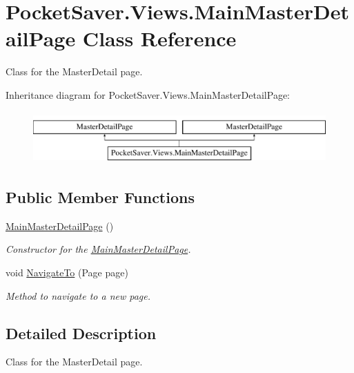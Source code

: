 \hypertarget{class_pocket_saver_1_1_views_1_1_main_master_detail_page}{}\section{Pocket\+Saver.\+Views.\+Main\+Master\+Detail\+Page Class Reference}
\label{class_pocket_saver_1_1_views_1_1_main_master_detail_page}


Class for the Master\+Detail page.  


Inheritance diagram for Pocket\+Saver.\+Views.\+Main\+Master\+Detail\+Page\+:\begin{figure}[H]
\begin{center}
\leavevmode
\includegraphics[height=2.000000cm]{class_pocket_saver_1_1_views_1_1_main_master_detail_page}
\end{center}
\end{figure}
\subsection*{Public Member Functions}
\begin{DoxyCompactItemize}
\item 
\hyperlink{class_pocket_saver_1_1_views_1_1_main_master_detail_page_ac8ec8ea55d0c0c111d1c58255406f16f}{Main\+Master\+Detail\+Page} ()
\begin{DoxyCompactList}\small\item\em Constructor for the \hyperlink{class_pocket_saver_1_1_views_1_1_main_master_detail_page}{Main\+Master\+Detail\+Page}. \end{DoxyCompactList}\item 
void \hyperlink{class_pocket_saver_1_1_views_1_1_main_master_detail_page_a5350164e6e86879fc93ba9821459eccf}{Navigate\+To} (Page page)
\begin{DoxyCompactList}\small\item\em Method to navigate to a new page. \end{DoxyCompactList}\end{DoxyCompactItemize}


\subsection{Detailed Description}
Class for the Master\+Detail page. 



